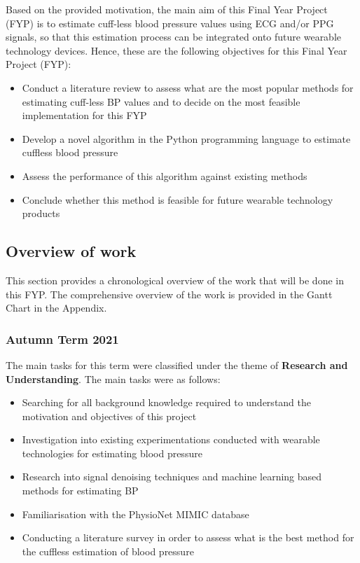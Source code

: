 Based on the provided motivation, the main aim of this Final Year Project (FYP) is to estimate 
cuff-less blood pressure values using ECG and/or PPG signals, so that this estimation process 
can be integrated onto future wearable technology devices. Hence, these are the following objectives 
for this Final Year Project (FYP):

\begin{itemize}
    \item Conduct a literature review to assess what are the most popular methods for estimating cuff-less BP values and to decide on the most feasible implementation for this FYP\\
    \item Develop a novel algorithm in the Python programming language to estimate cuffless blood pressure\\
    \item Assess the performance of this algorithm against existing methods\\
    \item Conclude whether this method is feasible for future wearable technology products
\end{itemize}

\subsection{Overview of work}
This section provides a chronological overview of the work that will be done in this FYP. The comprehensive overview 
of the work is provided in the Gantt Chart in the Appendix.

\subsubsection{Autumn Term 2021}
The main tasks for this term were classified under the theme of \textbf{Research and Understanding}. The main tasks were as follows:
\begin{itemize}
    \item Searching for all background knowledge required to understand the motivation and objectives of this project
    \item Investigation into existing experimentations conducted with wearable technologies for estimating blood pressure
    \item Research into signal denoising techniques and machine learning based methods for estimating BP
    \item Familiarisation with the PhysioNet MIMIC database
    \item Conducting a literature survey in order to assess what is the best method for the cuffless estimation of blood pressure
\end{itemize}

